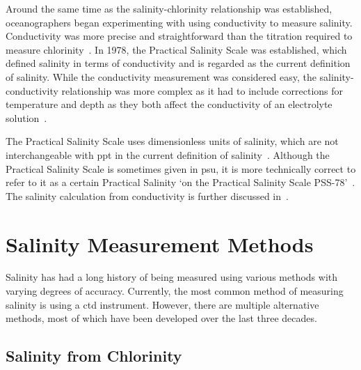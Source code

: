 Around the same time as the salinity-chlorinity relationship was established, oceanographers began experimenting with using conductivity to measure salinity.
Conductivity was more precise and straightforward than the titration required to measure chlorinity~\cite{lewis_salinity_definition_and_calculation_1978}.
In 1978, the Practical Salinity Scale was established, which defined salinity in terms of conductivity and is regarded as the current definition of salinity\cite{lewis_salinity_definition_and_calculation_1978}.
While the conductivity measurement was considered easy, the salinity-conductivity relationship was more complex as it had to include corrections for temperature and depth as they both affect the conductivity of an electrolyte solution~\cite{zheng_electrical_conductivity_of_ocean_2017}.

The Practical Salinity Scale uses dimensionless units of salinity, which are not interchangeable with \gls{ppt} in the current definition of salinity~\cite{ioc_teos_2010}.
Although the Practical Salinity Scale is sometimes given in \gls{psu}, it is more technically correct to refer to it as a certain Practical Salinity `on the Practical Salinity Scale PSS-78'~\cite{lewis_salinity_definition_and_calculation_1978}.
The salinity calculation from conductivity is further discussed in~.


\section{Salinity Measurement Methods}\label{sec:salinity-measurement-techniques}

Salinity has had a long history of being measured using various methods with varying degrees of accuracy.
Currently, the most common method of measuring salinity is using a \gls{ctd} instrument. 
However, there are multiple alternative methods, most of which have been developed over the last three decades.

\subsection{Salinity from Chlorinity}\label{subsec:salinity-from-chlorinity}

